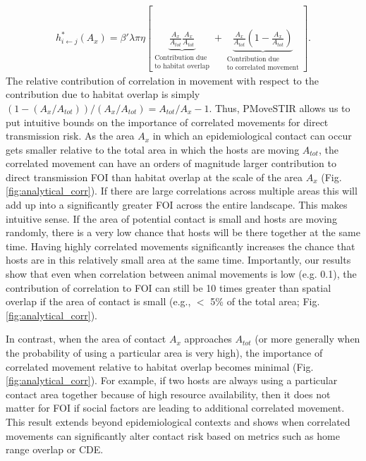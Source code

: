 \documentclass[letterpaper]{article}
\begin{document}
\begin{equation}
    \begin{aligned}
        h^*_{i \leftarrow j}(A_x) = \beta' \lambda \pi \eta \left[\underbrace{\frac{A_x}{A_{tot}}\frac{A_x}{A_{tot}}}_{\substack{\text{Contribution due} \\  \text{to habitat overlap}}} + \underbrace{\frac{A_x}{A_{tot}}(1 - \frac{A_x}{A_{tot}})}_{\substack{\text{Contribution due} \\ \text{to correlated movement}}} \right].
    \end{aligned}
    \label{eq:uniform_direct}
\end{equation}
The relative contribution of correlation in movement with respect to the contribution due to habitat overlap is simply $(1 - (A_x / A_{tot})) / (A_x / A_{tot})=A_{tot}/A_x-1$. 
Thus, PMoveSTIR allows us to put intuitive bounds on the importance of correlated movements for direct transmission risk. 
As the area $A_x$ in which an epidemiological contact can occur gets smaller relative to the total area in which the hosts are moving $A_{tot}$, the correlated movement can have an orders of magnitude larger contribution to direct transmission FOI than habitat overlap at the scale of the area $A_x$ (Fig. \ref{fig:analytical_corr}). If there are large correlations across multiple areas this will add up into a significantly greater FOI across the entire landscape. 
This makes intuitive sense. If the area of potential contact is small and hosts are moving randomly, there is a very low chance that hosts will be there together at the same time.  Having highly correlated movements significantly increases the chance that hosts are in this relatively small area at the same time. Importantly, our results show that even when correlation between animal movements is low (e.g. 0.1), the contribution of correlation to FOI can still be 10 times greater than spatial overlap if the area of contact is small (e.g., $<$ 5\% of the total area; Fig. \ref{fig:analytical_corr}).

In contrast, when the area of contact $A_x$ approaches $A_{tot}$ (or more generally when the probability of using a particular area is very high), the importance of correlated movement relative to habitat overlap becomes minimal (Fig. \ref{fig:analytical_corr}). For example, if two hosts are always using a particular contact area together because of high resource availability, then it does not matter for FOI if social factors are leading to additional correlated movement. This result extends beyond epidemiological contexts and shows when correlated movements can significantly alter contact risk based on metrics such as home range overlap or CDE.
\end{document}
